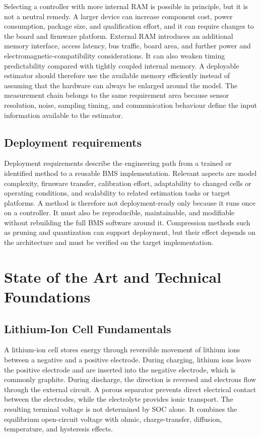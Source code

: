 \documentclass[
    a4paper,
    12pt,
    titlepage,
    bibliography=totoc,
    twoside=on,
    parskip=false,
    numbers=noenddot,
    cleardoublepage=empty,
    DIV=12,
    BCOR=12.0mm,
    headheight=36pt,
    headings=openright
]{scrreprt}
\begin{document}
Selecting a controller with more internal RAM is possible in principle, but it is not a neutral remedy. A larger device can increase component cost, power consumption, package size, and qualification effort, and it can require changes to the board and firmware platform. External RAM introduces an additional memory interface, access latency, bus traffic, board area, and further power and electromagnetic-compatibility considerations. It can also weaken timing predictability compared with tightly coupled internal memory. A deployable estimator should therefore use the available memory efficiently instead of assuming that the hardware can always be enlarged around the model. The measurement chain belongs to the same requirement area because sensor resolution, noise, sampling timing, and communication behaviour define the input information available to the estimator.

\section{Deployment requirements}
Deployment requirements describe the engineering path from a trained or identified method to a reusable BMS implementation. Relevant aspects are model complexity, firmware transfer, calibration effort, adaptability to changed cells or operating conditions, and scalability to related estimation tasks or target platforms. A method is therefore not deployment-ready only because it runs once on a controller. It must also be reproducible, maintainable, and modifiable without rebuilding the full BMS software around it. Compression methods such as pruning and quantization can support deployment, but their effect depends on the architecture and must be verified on the target implementation.\autocite{hanLearningBothWeights2015,jacobQuantizationTrainingNeural2017}

\chapter{State of the Art and Technical Foundations}
\label{chap:foundations}

\section{Lithium-Ion Cell Fundamentals}
A lithium-ion cell stores energy through reversible movement of lithium ions between a negative and a positive electrode. During charging, lithium ions leave the positive electrode and are inserted into the negative electrode, which is commonly graphite. During discharge, the direction is reversed and electrons flow through the external circuit. A porous separator prevents direct electrical contact between the electrodes, while the electrolyte provides ionic transport. The resulting terminal voltage is not determined by SOC alone. It combines the equilibrium open-circuit voltage with ohmic, charge-transfer, diffusion, temperature, and hysteresis effects.\autocite{kurzweilElektrochemischeSpeicherSuperkondensatoren2018,plettBatteryManagementSystems2015}
\end{document}
